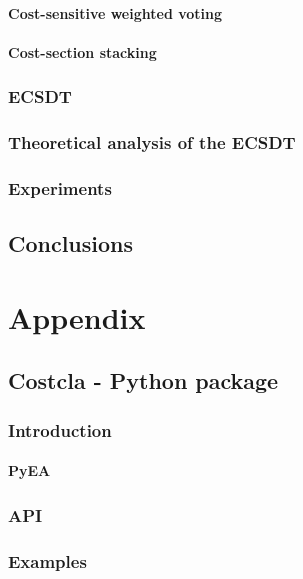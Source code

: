 \documentclass[twoside,openright,titlepage,numbers=noenddot,headinclude,%
               footinclude=true,cleardoublepage=empty,abstractoff,BCOR=5mm,%
               paper=a4,fontsize=12pt,ngerman,american]{scrreprt} %
\numberwithin{theorem}{chapter}
\numberwithin{definition}{chapter}
\numberwithin{algorithm}{chapter}
\numberwithin{figure}{chapter}
\numberwithin{table}{chapter}
\numberwithin{equation}{chapter}
\begin{document}
			\subsection{Cost-sensitive weighted voting}
			\subsection{Cost-section stacking}
		\section{ECSDT}
		\section{Theoretical analysis of the ECSDT}
		\section{Experiments}
			
 
\cleardoublepage
\makeatletter
\def\toclevel@chapter{-1}
\makeatother
\chapter{Conclusions}

\appendix
\cleardoublepage
\part{Appendix}
	\chapter{Costcla - Python package}
		\section{Introduction}
			\subsection{PyEA}
		\section{API}
		\section{Examples}

\cleardoublepage
\cleardoublepage
\end{document}

